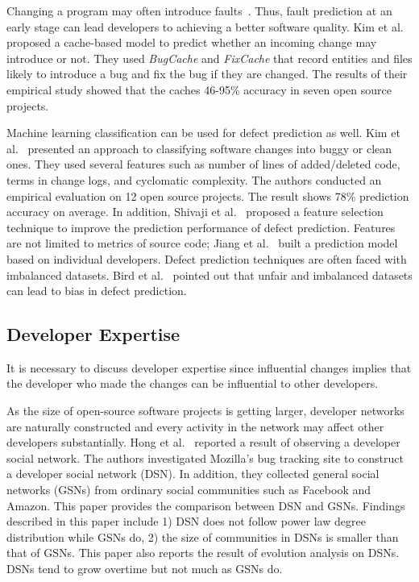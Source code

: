 Changing a program may often introduce
faults~\cite{sliwerski_hatari:_2005,kim_automatic_2006}.
Thus, fault prediction at an early stage can lead developers to achieving
a better software quality. Kim et al.~\cite{kim_predicting_2007} proposed a
cache-based model to predict whether an incoming change may introduce or not.
They used \emph{BugCache} and \emph{FixCache} that record entities and files
likely to introduce a bug and fix the bug if they are changed. The results of
their empirical study showed that the caches 46-95\% accuracy in seven open
source projects.

Machine learning classification can be used for defect prediction as well. Kim
et al.~\cite{kim_classifying_2008} presented an approach to classifying
software changes into buggy or clean ones. They used several features such as number of
lines of added/deleted code, terms in change logs, and cyclomatic complexity.
The authors conducted an empirical evaluation on 12 open source projects. The
result shows 78\% prediction accuracy on average. In addition, Shivaji et
al.~\cite{shivaji_reducing_2009} proposed a feature selection technique to
improve the prediction performance of defect prediction. Features are not
limited to metrics of source code; Jiang et al.~\cite{jiang_personalized_2013}
built a prediction model based on individual developers. Defect prediction
techniques are often faced with imbalanced datasets. Bird et
al.~\cite{bird_fair_2009} pointed out that unfair and imbalanced datasets can
lead to bias in defect prediction.


\subsection{Developer Expertise}

It is necessary to discuss developer expertise since influential changes implies
that the developer who made the changes can be influential to other developers.

As the size of open-source software projects is getting larger, developer
networks are naturally constructed and every activity in the network may affect
other developers substantially. Hong et al.~\cite{hong_understanding_2011}
reported a result of observing a developer social network. The authors
investigated Mozilla's bug tracking site to construct a developer social network
(DSN). In addition, they collected general social networks (GSNs) from ordinary
social communities such as Facebook and Amazon. This paper provides the
comparison between DSN and GSNs. Findings described in this paper include 1) DSN
does not follow power law degree distribution while GSNs do, 2) the size of
communities in DSNs is smaller than that of GSNs. This paper also reports the
result of evolution analysis on DSNs. DSNs tend to grow overtime but not much as
GSNs do.

